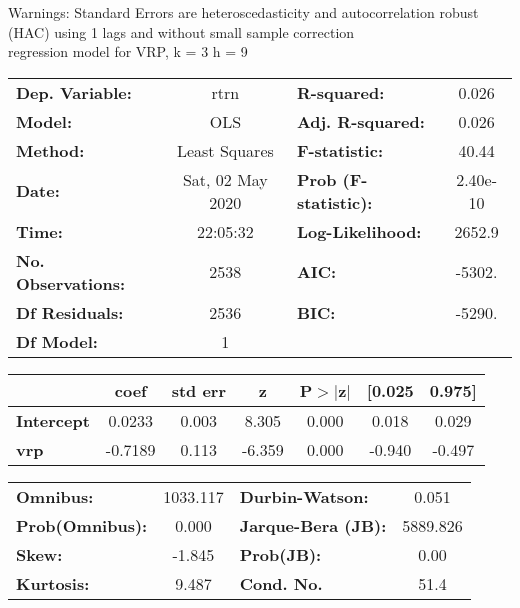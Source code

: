 Warnings: \newline
 [1] Standard Errors are heteroscedasticity and autocorrelation robust (HAC) using 1 lags and without small sample correction\\ 

regression model for VRP, k = 3 h = 9\begin{center}
\begin{tabular}{lclc}
\toprule
\textbf{Dep. Variable:}    &       rtrn       & \textbf{  R-squared:         } &     0.026   \\
\textbf{Model:}            &       OLS        & \textbf{  Adj. R-squared:    } &     0.026   \\
\textbf{Method:}           &  Least Squares   & \textbf{  F-statistic:       } &     40.44   \\
\textbf{Date:}             & Sat, 02 May 2020 & \textbf{  Prob (F-statistic):} &  2.40e-10   \\
\textbf{Time:}             &     22:05:32     & \textbf{  Log-Likelihood:    } &    2652.9   \\
\textbf{No. Observations:} &        2538      & \textbf{  AIC:               } &    -5302.   \\
\textbf{Df Residuals:}     &        2536      & \textbf{  BIC:               } &    -5290.   \\
\textbf{Df Model:}         &           1      & \textbf{                     } &             \\
\bottomrule
\end{tabular}
\begin{tabular}{lcccccc}
                   & \textbf{coef} & \textbf{std err} & \textbf{z} & \textbf{P$> |$z$|$} & \textbf{[0.025} & \textbf{0.975]}  \\
\midrule
\textbf{Intercept} &       0.0233  &        0.003     &     8.305  &         0.000        &        0.018    &        0.029     \\
\textbf{vrp}       &      -0.7189  &        0.113     &    -6.359  &         0.000        &       -0.940    &       -0.497     \\
\bottomrule
\end{tabular}
\begin{tabular}{lclc}
\textbf{Omnibus:}       & 1033.117 & \textbf{  Durbin-Watson:     } &    0.051  \\
\textbf{Prob(Omnibus):} &   0.000  & \textbf{  Jarque-Bera (JB):  } & 5889.826  \\
\textbf{Skew:}          &  -1.845  & \textbf{  Prob(JB):          } &     0.00  \\
\textbf{Kurtosis:}      &   9.487  & \textbf{  Cond. No.          } &     51.4  \\
\bottomrule
\end{tabular}
\end{center}

